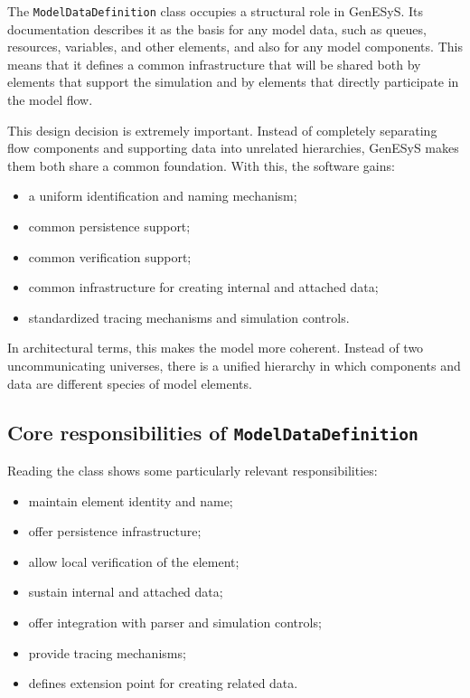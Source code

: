 The \texttt{ModelDataDefinition} class occupies a structural role in GenESyS. Its documentation describes it as the basis for any model data, such as queues, resources, variables, and other elements, and also for any model components. This means that it defines a common infrastructure that will be shared both by elements that support the simulation and by elements that directly participate in the model flow.

This design decision is extremely important. Instead of completely separating flow components and supporting data into unrelated hierarchies, GenESyS makes them both share a common foundation. With this, the software gains:
\begin{itemize}
 \item a uniform identification and naming mechanism;
 \item common persistence support;
 \item common verification support;
 \item common infrastructure for creating internal and attached data;
 \item standardized tracing mechanisms and simulation controls.
\end{itemize}

In architectural terms, this makes the model more coherent. Instead of two uncommunicating universes, there is a unified hierarchy in which components and data are different species of model elements.

\subsection{Core responsibilities of \texttt{ModelDataDefinition}}
\label{subsec:cap8_responsabilidades_modeldatadefinition}

Reading the class shows some particularly relevant responsibilities:
\begin{itemize}
 \item maintain element identity and name;
 \item offer persistence infrastructure;
 \item allow local verification of the element;
 \item sustain internal and attached data;
 \item offer integration with parser and simulation controls;
 \item provide tracing mechanisms;
 \item defines extension point for creating related data.
\end{itemize}

